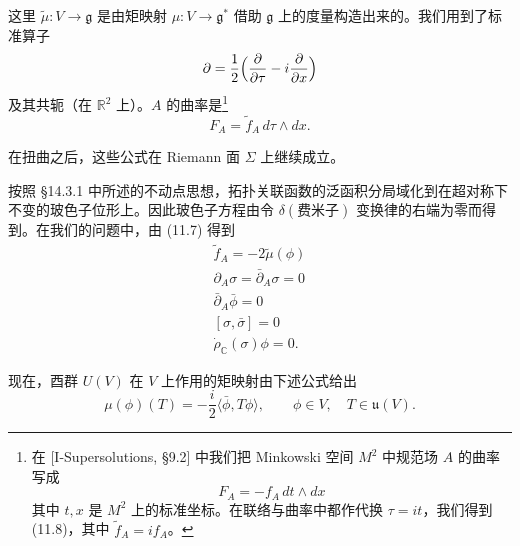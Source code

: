 这里 $\tilde\mu:V\to\mathfrak{g}$ 是由矩映射 $\mu:V\to\mathfrak{g}^*$ 借助 $\mathfrak{g}$ 上的度量构造出来的。我们用到了标准算子
\[
  \partial=\frac12\Bigl(\frac{\partial}{\partial\tau}-i\frac{\partial}{\partial x}\Bigr)
\]
及其共轭（在 $\mathbb{R}^2$ 上）。$A$ 的曲率是\footnote{%
在 [I-Supersolutions, §9.2] 中我们把 Minkowski 空间 $M^2$ 中规范场 $A$ 的曲率写成
\[
  F_A=-f_A\,dt\wedge dx
\]
其中 $t,x$ 是 $M^2$ 上的标准坐标。在联络与曲率中都作代换 $\tau=it$，我们得到 (11.8)，其中 $\tilde f_A=if_A$。}
\begin{equation}
  \tag{11.8}
  \label{eq:sol11-8}
  F_A=\tilde f_A\,d\tau\wedge dx.
\end{equation}


在扭曲之后，这些公式在 Riemann 面 $\Sigma$ 上继续成立。

按照 §14.3.1 中所述的不动点思想，拓扑关联函数的泛函积分局域化到在超对称下不变的玻色子位形上。因此玻色子方程由令 $\delta(\text{费米子})$ 变换律的右端为零而得到。在我们的问题中，由 (11.7) 得到
\begin{equation}
  \tag{11.9}
  \label{eq:sol11-9}
  \begin{array}{c}
    \tilde f_A=-2\tilde\mu(\phi)\\[3pt]
    \partial_A\sigma=\bar\partial_A\sigma=0\\[3pt]
    \bar\partial_A\bar\phi=0\\[3pt]
    [\sigma,\bar\sigma]=0\\[3pt]
    \dot\rho_{\mathbb{C}}(\sigma)\phi=0.
  \end{array}
\end{equation}

现在，酉群 $U(V)$ 在 $V$ 上作用的矩映射由下述公式给出
\begin{equation}
  \tag{11.10}
  \label{eq:sol11-10}
  \mu(\phi)(T)=-\frac{i}{2}\langle\bar\phi,T\phi\rangle,\qquad \phi\in V,\quad T\in\mathfrak{u}(V).
\end{equation}

